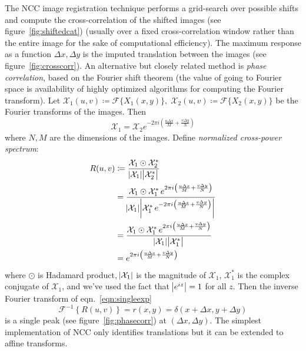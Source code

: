 
%
The NCC image registration technique performs a grid-search over possible shifts and compute the cross-correlation of the shifted images (see figure~\ref{fig:shiftedcat}) (usually over a fixed cross-correlation window rather than the entire image for the sake of computational efficiency).
%
The maximum response as a function \(\Delta x, \Delta y\) is the imputed translation between the images (see figure~\ref{fig:crosscorr}).
%
An alternative but closely related method is \textit{phase correlation}, based on the Fourier shift theorem  (the value of going to Fourier space is availability of highly optimized algorithms for computing the Fourier transform).
%
Let \(\mathcal{X}_1(u,v) \coloneqq \mathcal{F}\{X_1(x,y)\}, \; \mathcal{X}_2(u,v) \coloneqq \mathcal{F}\{X_2(x,y)\}\) be the Fourier transforms of the images.
%
Then
\[
	\mathcal{X}_1 = \mathcal{X}_2  e^{-2 \pi i \left(\frac{u \Delta x}{M} + \frac{v \Delta y}{N}\right)}
\]
where \(N,M\) are the dimensions of the images.
%
Define \textit{normalized cross-power spectrum}:
\begin{align}
	R(u,v) & \coloneqq \frac{\mathcal{X}_1\odot \mathcal{X}_2^{*}}{\abs{\mathcal{X}_1 }\abs{\mathcal{X}_2^{*} }}                                                                                                                    \\
	       & = \frac{\mathcal{X}_1\odot \mathcal{X}_1^{*} \, e^{2 \pi i \left(\frac{u \Delta x}{M} + \frac{v \Delta y}{N}\right)}}{\abs{\mathcal{X}_1 }\abs{\mathcal{X}_1^{*} \, e^{-2 \pi i \left(\frac{u \Delta x}{M} + \frac{v \Delta y}{N}\right)} }} \\
	       & = \frac{\mathcal{X}_1\odot \mathcal{X}_1^{*} \, e^{2 \pi i \left(\frac{u \Delta x}{M} + \frac{v \Delta y}{N}\right)}}{\abs{\mathcal{X}_1 }\abs{\mathcal{X}_1^{*} }}                                                               \\
	       & = e^{2 \pi i \left(\frac{u \Delta x}{M} + \frac{v \Delta y}{N}\right)} \label{eqn:singleexp}
\end{align}
where \(\odot\) is Hadamard product, \(\abs{\mathcal{X}_1}\) is the magnitude of \(\mathcal{X}_1\), \(\mathcal{X}_1^*\) is the complex conjugate of \(\mathcal{X}_1\), and we've used the fact that \(\abs{e^{iz}}=1\) for all \(z\).
%
Then the inverse Fourier transform of eqn.~\eqref{eqn:singleexp}
\[
	\mathcal{F}^{-1}\left\{ R(u,v) \right\} = r(x,y) = \delta(x + \Delta x, y + \Delta y)
\]
is a single peak (see figure~\ref{fig:phasecorr}) at \((\Delta x, \Delta y)\).
%
The simplest implementation of NCC only identifies translations but it can be extended to affine transforms\cite{berthilsson1998}.

